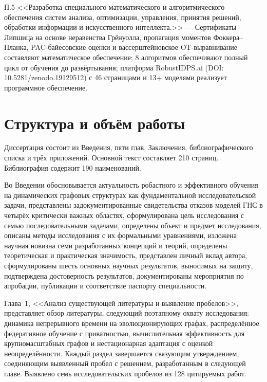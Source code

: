 \noindent П.5 <<Разработка специального математического и алгоритмического обеспечения систем анализа, оптимизации, управления, принятия решений, обработки информации и искусственного интеллекта.>> --- Сертификаты Липшица на основе неравенства Грёнуолла, пропагация моментов Фоккера--Планка, PAC-байесовские оценки и вассерштейновское OT-выравнивание составляют математическое обеспечение; 8 алгоритмов обеспечивают полный цикл от обучения до развёртывания; платформа RobustIDPS.ai (DOI: 10.5281/zenodo.19129512) с 46 страницами и 13+ моделями реализует программное обеспечение.


\section*{Структура и объём работы}

Диссертация состоит из Введения, пяти глав, Заключения, библиографического списка и трёх приложений. Основной текст составляет 210 страниц. Библиография содержит 190 наименований.

Во Введении обосновывается актуальность робастного и эффективного обучения на динамических графовых структурах как фундаментальной исследовательской задачи, представлены задокументированные свидетельства отказов моделей ГНС в четырёх критически важных областях, сформулирована цель исследования с семью последовательными задачами, определены объект и предмет исследования, описаны методы исследования с их формальными уравнениями, изложена научная новизна семи разработанных концепций и теорий, определены теоретическая и практическая значимость, представлен личный вклад автора, сформулированы шесть основных научных результатов, выносимых на защиту, подтверждена достоверность результатов, документированы мероприятия по апробации, публикации и соответствие паспорту специальности.

Глава~1, <<Анализ существующей литературы и выявление пробелов>>, представляет обзор литературы, следующий поэтапному охвату исследования: динамика непрерывного времени на эволюционирующих графах, распределённое федеративное обучение с приватностью, вычислительная эффективность для крупномасштабных графов и нестационарная адаптация с оценкой неопределённости. Каждый раздел завершается связующим утверждением, соединяющим выявленный пробел с решением, разработанным в следующей главе. Выявлено семь исследовательских пробелов из 128 цитируемых работ.

